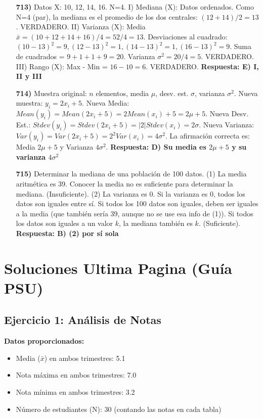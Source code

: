 \documentclass[12pt, a4paper]{article} %
\newcommand{\mean}[1]{\ensuremath{\bar{#1}}} %
\begin{document}
\begin{enumerate}
    \item[\bfseries 713)] Datos X: {10, 12, 14, 16}. N=4.
    I) Mediana (X): Datos ordenados. Como N=4 (par), la mediana es el promedio de los dos centrales: $(12+14)/2 = 13$. VERDADERO.
    II) Varianza (X): Media $\bar{x} = (10+12+14+16)/4 = 52/4 = 13$. Desviaciones al cuadrado: $(10-13)^2=9, (12-13)^2=1, (14-13)^2=1, (16-13)^2=9$. Suma de cuadrados = $9+1+1+9 = 20$. Varianza $\sigma^2 = 20/4 = 5$. VERDADERO.
    III) Rango (X): Max - Min = $16 - 10 = 6$. VERDADERO.
    \textbf{Respuesta: E) I, II y III}

    \item[\bfseries 714)] Muestra original: $n$ elementos, media $\mu$, desv. est. $\sigma$, varianza $\sigma^2$.
    Nueva muestra: $y_i = 2x_i + 5$.
    Nueva Media: $Mean(y_i) = Mean(2x_i + 5) = 2 Mean(x_i) + 5 = 2\mu + 5$.
    Nueva Desv. Est.: $Stdev(y_i) = Stdev(2x_i + 5) = |2| Stdev(x_i) = 2\sigma$.
    Nueva Varianza: $Var(y_i) = Var(2x_i + 5) = 2^2 Var(x_i) = 4\sigma^2$.
    La afirmación correcta es: Media $2\mu+5$ y Varianza $4\sigma^2$.
    \textbf{Respuesta: D) Su media es $2\mu + 5$ y su varianza $4\sigma^2$}

    \item[\bfseries 715)] Determinar la mediana de una población de 100 datos.
    (1) La media aritmética es 39. Conocer la media no es suficiente para determinar la mediana. (Insuficiente).
    (2) La varianza es 0. Si la varianza es 0, todos los datos son iguales entre sí. Si todos los 100 datos son iguales, deben ser iguales a la media (que también sería 39, aunque no se use esa info de (1)). Si todos los datos son iguales a un valor $k$, la mediana también es $k$. (Suficiente).
    \textbf{Respuesta: B) (2) por sí sola}

\end{enumerate}

\newpage %

\section*{Soluciones Ultima Pagina (Guía PSU)} %

\subsection*{Ejercicio 1: Análisis de Notas}
\textbf{Datos proporcionados:}
\begin{itemize}[nosep]
    \item Media (\mean{x}) en ambos trimestres: \num{5,1}
    \item Nota máxima en ambos trimestres: \num{7,0}
    \item Nota mínima en ambos trimestres: \num{3,2}
    \item Número de estudiantes (N): 30 (contando las notas en cada tabla)
\end{itemize}
\end{document}
